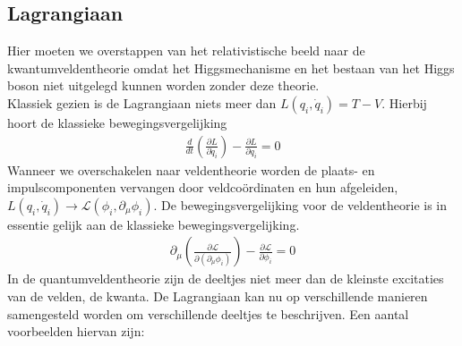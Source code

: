 \documentclass[../main.tex]{subfiles}
\begin{document}
\subsection{Lagrangiaan}%
\label{sub:lagrangiaan}

Hier moeten we overstappen van het relativistische beeld naar de kwantumveldentheorie omdat het Higgsmechanisme en het bestaan van het Higgs boson niet uitgelegd kunnen worden zonder deze theorie.\\
Klassiek gezien is de Lagrangiaan niets meer dan $L(q_i, \dot{q}_i) = T-V$. Hierbij hoort de klassieke bewegingsvergelijking
\begin{equation}
    \begin{aligned}
        \label{eq:klas_bewegingsvergelijking}
        \frac{d}{dt} \left( \frac{\partial L}{\partial \dot{q}_i} \right) - \frac{\partial L}{\partial q_i} =0
    \end{aligned}
\end{equation}
Wanneer we overschakelen naar veldentheorie worden de plaats- en impulscomponenten vervangen door veldcoördinaten en hun afgeleiden, $L(q_i,\dot{q}_i) \rightarrow \mathcal{L}(\phi_i, \partial_\mu\phi_i)$. De bewegingsvergelijking voor de veldentheorie is in essentie gelijk aan de klassieke bewegingsvergelijking.
\begin{equation}
    \begin{aligned}
        \label{eq:velden_bewegingsvergelijking}
        \partial_\mu \left( \frac{\partial \mathcal{L}}{\partial(\partial_\mu \phi_i)} \right) - \frac{\partial \mathcal{L}}{\partial \phi_i} = 0
    \end{aligned}
\end{equation}
In de quantumveldentheorie zijn de deeltjes niet meer dan de kleinste excitaties van de velden, de kwanta. De Lagrangiaan kan nu op verschillende manieren samengesteld worden om verschillende deeltjes te beschrijven. Een aantal voorbeelden hiervan zijn:
\end{document}
